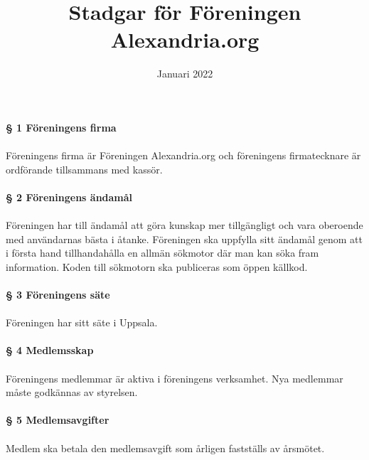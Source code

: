 \documentclass[12pt, a4paper]{article}
\title{Stadgar för Föreningen Alexandria.org}
\date{Januari 2022}
\begin{document}
\maketitle

\paragraph{§ 1 Föreningens firma}
\paragraph{}
Föreningens firma är Föreningen Alexandria.org och föreningens firmatecknare är ordförande tillsammans med kassör.

\paragraph{§ 2 Föreningens ändamål}
\paragraph{}
Föreningen har till ändamål att göra kunskap mer tillgängligt och vara oberoende med användarnas bästa i åtanke. Föreningen ska uppfylla
sitt ändamål genom att i första hand tillhandahålla en allmän sökmotor där man kan söka fram information. Koden till sökmotorn ska publiceras som öppen källkod.

\paragraph{§ 3 Föreningens säte}
\paragraph{}
Föreningen har sitt säte i Uppsala.

\paragraph{§ 4 Medlemsskap}
\paragraph{}
Föreningens medlemmar är aktiva i föreningens verksamhet. Nya medlemmar måste godkännas av styrelsen.

\paragraph{§ 5 Medlemsavgifter}
\paragraph{}
Medlem ska betala den medlemsavgift som årligen fastställs av årsmötet.
\end{document}
